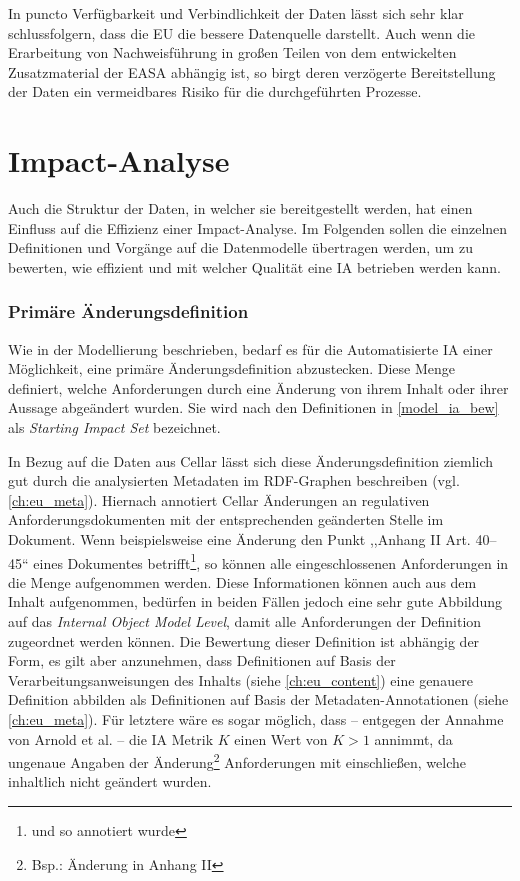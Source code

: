     \medskip
    In puncto Verfügbarkeit und Verbindlichkeit der Daten lässt sich sehr klar schlussfolgern, dass die \ac{EU} die bessere Datenquelle darstellt.
    Auch wenn die Erarbeitung von Nachweisführung in großen Teilen von dem entwickelten Zusatzmaterial der \ac{EASA} abhängig ist, so birgt deren verzögerte Bereitstellung der Daten ein vermeidbares Risiko für die durchgeführten Prozesse.
    
\pagebreak
\section{Impact-Analyse}
    
    Auch die Struktur der Daten, in welcher sie bereitgestellt werden, hat einen Einfluss auf die Effizienz einer Impact-Analyse.
    Im Folgenden sollen die einzelnen Definitionen und Vorgänge auf die Datenmodelle übertragen werden, um zu bewerten, wie effizient und mit welcher Qualität eine \ac{IA} betrieben werden kann.
    
\subsubsection{Primäre Änderungsdefinition}

    Wie in der Modellierung beschrieben, bedarf es für die Automatisierte \ac{IA} einer Möglichkeit, eine primäre Änderungsdefinition abzustecken. 
    Diese Menge definiert, welche Anforderungen durch eine Änderung von ihrem Inhalt oder ihrer Aussage abgeändert wurden.
    Sie wird nach den Definitionen in \ref{model_ia_bew}  als \textit{Starting Impact Set}  bezeichnet.
    
    \medskip
    In Bezug auf die Daten aus Cellar lässt sich diese Änderungsdefinition ziemlich gut durch die analysierten Metadaten im \ac{RDF}-Graphen beschreiben (vgl. \ref{ch:eu_meta}).
    Hiernach annotiert Cellar Änderungen an regulativen Anforderungsdokumenten mit der entsprechenden geänderten Stelle im Dokument.
    Wenn beispielsweise eine Änderung den Punkt ,,Anhang II Art. 40--45`` eines Dokumentes betrifft\footnote{und so annotiert wurde}, so können alle eingeschlossenen Anforderungen in die Menge aufgenommen werden.
    Diese Informationen können auch aus dem Inhalt aufgenommen, bedürfen in beiden Fällen jedoch eine sehr gute Abbildung auf das \textit{Internal Object Model Level}, damit alle Anforderungen der Definition zugeordnet werden können.
    Die Bewertung dieser Definition ist abhängig der Form, es gilt aber anzunehmen, dass Definitionen auf Basis der Verarbeitungsanweisungen des Inhalts (siehe \ref{ch:eu_content}) eine genauere Definition abbilden als Definitionen auf Basis der Metadaten-Annotationen (siehe \ref{ch:eu_meta}). 
    Für letztere wäre es sogar möglich, dass -- entgegen der Annahme von Arnold et al. -- die \ac{IA} Metrik $K$ einen Wert von $K > 1$ annimmt, da ungenaue Angaben der Änderung\footnote{Bsp.: Änderung in Anhang II} Anforderungen mit einschließen, welche inhaltlich nicht geändert wurden. 
    
